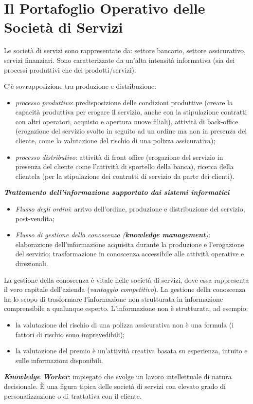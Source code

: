\documentclass[a4paper, notitlepage, 9pt]{extreport}
\begin{document}
\section*{Il Portafoglio Operativo delle Società di Servizi}
Le società di servizi sono rappresentate da: settore bancario, settore assicurativo, servizi finanziari. Sono caratterizzate da un'alta intensità informativa (sia dei processi produttivi che dei prodotti/servizi).

\noindent
C'è sovrapposizione tra produzione e distribuzione:
\begin{itemize}
	\item \textit{processo produttivo}: predisposizione delle condizioni produttive (creare la capacità produttiva per erogare il servizio, anche con la stipulazione contratti con altri operatori, acquisto e apertura nuove filiali), attività di back-office (erogazione del servizio svolto in seguito ad un ordine ma non in presenza del cliente, come la valutazione del rischio di una polizza assicurativa);
	\item \textit{processo distributivo}: attività di front office (erogazione del servizio in presenza del cliente come l'attività di sportello della banca), ricerca della clientela (per la stipulazione dei contratti di servizio da parte dei clienti).
\end{itemize}

\textit{\textbf{Trattamento dell'informazione supportato dai sistemi informatici}}
\begin{itemize}
	\item \textit{Flusso degli ordini}: arrivo dell'ordine, produzione e distribuzione del servizio, post-vendita;
	\item \textit{Flusso di gestione della conoscenza (\textbf{knowledge management})}: elaborazione dell’informazione acquisita durante la produzione e l’erogazione del servizio; trasformazione in conoscenza accessibile alle attività operative e direzionali.
\end{itemize}
La gestione della conoscenza è vitale nelle società di servizi, dove essa rappresenta il vero capitale dell’azienda (\textit{vantaggio competitivo}). La gestione della conoscenza ha lo scopo di trasformare l’informazione non strutturata in informazione comprensibile a qualunque esperto. L’informazione non è strutturata, ad esempio:
\begin{itemize}
	\item la valutazione del rischio di una polizza assicurativa non è una formula (i fattori di rischio sono imprevedibili);
	\item la valutazione del premio è un’attività creativa basata su esperienza, intuito e sulle informazioni disponibili.
\end{itemize}
\textit{\textbf{Knowledge Worker}}: impiegato che svolge un lavoro intellettuale di natura decisionale. \MakeUppercase{è} una figura tipica delle società di servizi con elevato grado di personalizzazione o di trattativa con il cliente.
\end{document}
